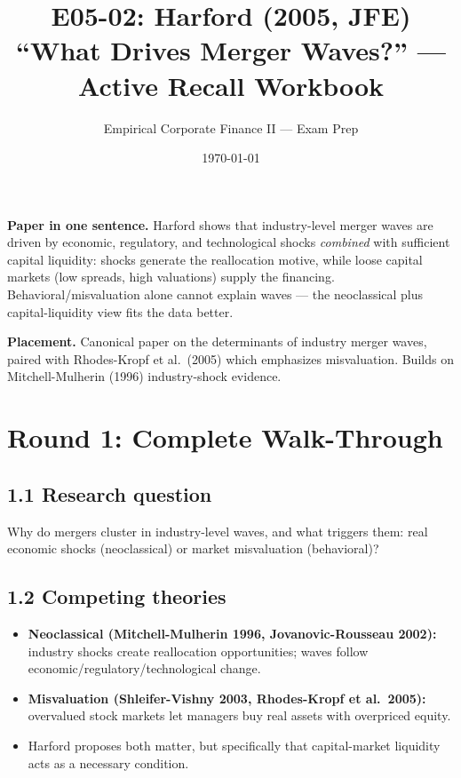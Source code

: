 \documentclass[11pt]{article}
\title{E05-02: Harford (2005, JFE) \\
\large ``What Drives Merger Waves?'' --- Active Recall Workbook}
\author{Empirical Corporate Finance II --- Exam Prep}
\date{\today}
\begin{document}
\maketitle

\begin{keybox}
\textbf{Paper in one sentence.} Harford shows that industry-level merger waves are driven by economic, regulatory, and technological shocks \emph{combined} with sufficient capital liquidity: shocks generate the reallocation motive, while loose capital markets (low spreads, high valuations) supply the financing. Behavioral/misvaluation alone cannot explain waves --- the neoclassical plus capital-liquidity view fits the data better.

\textbf{Placement.} Canonical paper on the determinants of industry merger waves, paired with Rhodes-Kropf et al.\ (2005) which emphasizes misvaluation. Builds on Mitchell-Mulherin (1996) industry-shock evidence.
\end{keybox}

\section*{Round 1: Complete Walk-Through}

\subsection*{1.1 Research question}
Why do mergers cluster in industry-level waves, and what triggers them: real economic shocks (neoclassical) or market misvaluation (behavioral)?

\subsection*{1.2 Competing theories}
\begin{itemize}
\item \textbf{Neoclassical (Mitchell-Mulherin 1996, Jovanovic-Rousseau 2002):} industry shocks create reallocation opportunities; waves follow economic/regulatory/technological change.
\item \textbf{Misvaluation (Shleifer-Vishny 2003, Rhodes-Kropf et al.\ 2005):} overvalued stock markets let managers buy real assets with overpriced equity.
\item Harford proposes both matter, but specifically that capital-market liquidity acts as a necessary condition.
\end{itemize}
\end{document}
